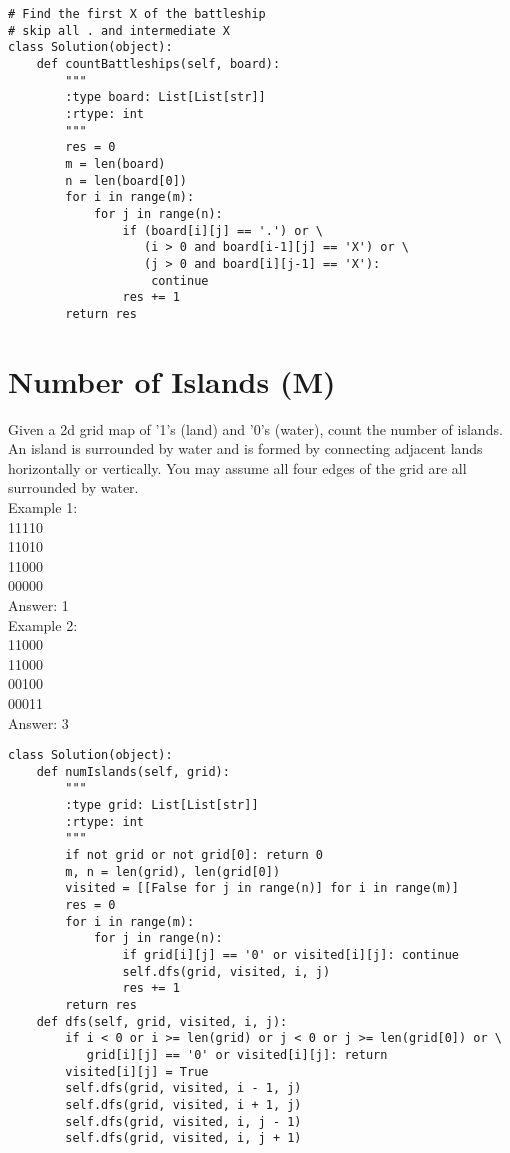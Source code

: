 \begin{lstlisting}
# Find the first X of the battleship
# skip all . and intermediate X
class Solution(object):
    def countBattleships(self, board):
        """
        :type board: List[List[str]]
        :rtype: int
        """
        res = 0
        m = len(board)
        n = len(board[0])
        for i in range(m):
            for j in range(n):
                if (board[i][j] == '.') or \
                   (i > 0 and board[i-1][j] == 'X') or \
                   (j > 0 and board[i][j-1] == 'X'):
                    continue
                res += 1
        return res
\end{lstlisting}


\section{Number of Islands (M)}
Given a 2d grid map of '1's (land) and '0's (water), count the number of islands. An island is surrounded by water and is formed by connecting adjacent lands horizontally or vertically. You may assume all four edges of the grid are all surrounded by water.\\

Example 1:\\
11110\\
11010\\
11000\\
00000\\
Answer: 1\\

Example 2:\\
11000\\
11000\\
00100\\
00011\\
Answer: 3\\

\begin{lstlisting}
class Solution(object):
    def numIslands(self, grid):
        """
        :type grid: List[List[str]]
        :rtype: int
        """
        if not grid or not grid[0]: return 0
        m, n = len(grid), len(grid[0])
        visited = [[False for j in range(n)] for i in range(m)]
        res = 0
        for i in range(m):
            for j in range(n):
                if grid[i][j] == '0' or visited[i][j]: continue
                self.dfs(grid, visited, i, j)
                res += 1
        return res
    def dfs(self, grid, visited, i, j):
        if i < 0 or i >= len(grid) or j < 0 or j >= len(grid[0]) or \
           grid[i][j] == '0' or visited[i][j]: return
        visited[i][j] = True
        self.dfs(grid, visited, i - 1, j)
        self.dfs(grid, visited, i + 1, j)
        self.dfs(grid, visited, i, j - 1)
        self.dfs(grid, visited, i, j + 1)
\end{lstlisting}

